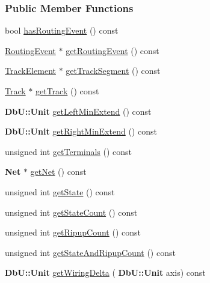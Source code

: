 \subsubsection*{Public Member Functions}
\begin{DoxyCompactItemize}
\item 
bool \hyperlink{classKite_1_1DataNegociate_abeeeb06293c85a902f2b56d1b13d260d}{has\+Routing\+Event} () const
\item 
\hyperlink{classKite_1_1RoutingEvent}{Routing\+Event} $\ast$ \hyperlink{classKite_1_1DataNegociate_a831dab8eb708da17b4f1e1a8c057f283}{get\+Routing\+Event} () const
\item 
\hyperlink{classKite_1_1TrackElement}{Track\+Element} $\ast$ \hyperlink{classKite_1_1DataNegociate_abc97e384245eab238831f9461968025b}{get\+Track\+Segment} () const
\item 
\hyperlink{classKite_1_1Track}{Track} $\ast$ \hyperlink{classKite_1_1DataNegociate_a3f34f9139b8491a0adb531ac3a904171}{get\+Track} () const
\item 
\textbf{ Db\+U\+::\+Unit} \hyperlink{classKite_1_1DataNegociate_a56149c72d0bfe5e33795782b646061b1}{get\+Left\+Min\+Extend} () const
\item 
\textbf{ Db\+U\+::\+Unit} \hyperlink{classKite_1_1DataNegociate_abf06c826acae81494b01b904d3277cc1}{get\+Right\+Min\+Extend} () const
\item 
unsigned int \hyperlink{classKite_1_1DataNegociate_a4f6fbcee2499d33394ab54f856c500c0}{get\+Terminals} () const
\item 
\textbf{ Net} $\ast$ \hyperlink{classKite_1_1DataNegociate_a692492374623a5c6096b2c4a51190359}{get\+Net} () const
\item 
unsigned int \hyperlink{classKite_1_1DataNegociate_a40ec2b23684a0e6e6d7ac9783a269037}{get\+State} () const
\item 
unsigned int \hyperlink{classKite_1_1DataNegociate_a6ad2b700f668f8e2e5cd4fbc717d8765}{get\+State\+Count} () const
\item 
unsigned int \hyperlink{classKite_1_1DataNegociate_a9832198737bd835fab730ff2b95bbfa0}{get\+Ripup\+Count} () const
\item 
unsigned int \hyperlink{classKite_1_1DataNegociate_acdd169f3bd670279f0a891caa809f99a}{get\+State\+And\+Ripup\+Count} () const
\item 
\textbf{ Db\+U\+::\+Unit} \hyperlink{classKite_1_1DataNegociate_af920f8ca7404239772e56d00f779cac6}{get\+Wiring\+Delta} (\textbf{ Db\+U\+::\+Unit} axis) const
\item 

\end{DoxyCompactItemize}
